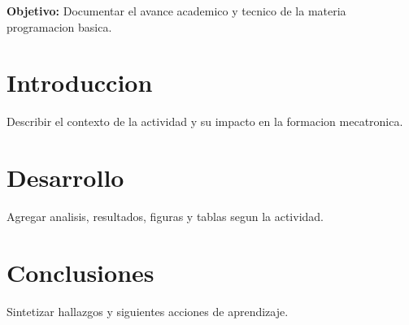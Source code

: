 \documentclass[spanish,letterpaper,oneside]{article}
\begin{document}
\templatePortrait
\templatePagecfg
\onehalfspacing

\begin{abstractd}
\textbf{Objetivo:} Documentar el avance academico y tecnico de la materia programacion basica.
\end{abstractd}

\templateIndex
\templateFinalcfg

\section{Introduccion}
Describir el contexto de la actividad y su impacto en la formacion mecatronica.

\section{Desarrollo}
Agregar analisis, resultados, figuras y tablas segun la actividad.

\section{Conclusiones}
Sintetizar hallazgos y siguientes acciones de aprendizaje.



\end{document}
